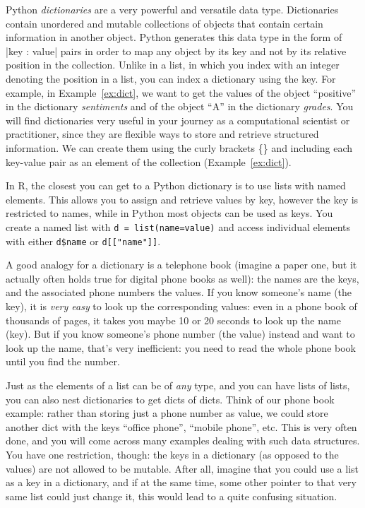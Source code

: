 Python \emph{dictionaries} are a very powerful and versatile data type.
Dictionaries contain unordered and mutable collections of objects that
contain certain information in another object. Python generates this
data type in the form of |{key : value}| pairs in order
to map any object by its key and not by its relative position in the
collection. Unlike in a list, in which you index with an integer denoting
the position in a list, you can index a dictionary using the key.
For example, in Example~\ref{ex:dict}, we want to get the values of the object ``positive'' in the
dictionary \emph{sentiments} and of the object ``A'' in the dictionary
\emph{grades}. You will
find dictionaries very useful in your journey as a computational
scientist or practitioner, since they are flexible ways to store and
retrieve structured information. We can create them using the curly
brackets \{\} and including each key-value pair as an element of the
collection (Example~\ref{ex:dict}).

In R, the closest you can get to a Python dictionary is to use lists with named elements.
This allows you to assign and retrieve values by key,
however the key is restricted to names, while in Python most objects can be used as keys.
You create a named list with \verb|d = list(name=value)| and access individual elements with either
\verb|d$name| or \verb|d[["name"]]|. 


A good analogy for a dictionary is a telephone book (imagine a paper
one, but it actually often holds true for digital phone books as
well): the names are the keys, and the associated phone numbers the
values. If you know someone's name (the key), it is \emph{very easy}
to look up the corresponding values: even in a phone book of thousands
of pages, it takes you maybe 10 or 20 seconds to look up the name
(key). But if you know someone's phone number (the value) instead and
want to look up the name, that's very inefficient: you need to read
the whole phone book until you find the number.

Just as the elements of a list can be of \emph{any} type, and you can
have lists of lists, you can also nest dictionaries to get dicts of
dicts. Think of our phone book example: rather than storing just a
phone number as value, we could store another dict with the keys
``office phone'', ``mobile phone'', etc. This is very often done, and you
will come across many examples dealing with such data structures.
You have one restriction, though: the keys in a dictionary (as opposed
to the values) are not allowed to be mutable. After all, imagine that
you could use a list as a key in a dictionary, and if at the same time,
some other pointer to that very same list could just change it, this
would lead to a quite confusing situation.





